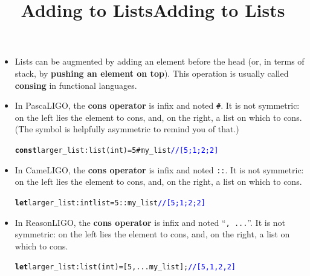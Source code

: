 \documentclass[wide]{slides}
\newcommand{\Kconst}[0]{\textbf{const}\xspace}
\newcommand{\Klet}[0]{\textbf{let}\xspace}
\newcommand{\com}[1]{\textcolor{blue}{{#1}}}
\begin{document}
\begin{slide}
  \title{Adding to Lists}

  \begin{itemize}

    \item Lists can be augmented by adding an element before the head
      (or, in terms of stack, by \textbf{pushing an element on
      top}). This operation is usually called \textbf{consing} in
      functional languages.

    \item In PascaLIGO, the \textbf{cons operator} is infix and noted
      \texttt{\#}. It is not symmetric: on the left lies the element to
      cons, and, on the right, a list on which to cons. (The symbol is
      helpfully asymmetric to remind you of that.)
      \begin{alltt}
\Kconst larger_list : list (int) = 5 \# my_list \com{// [5;1;2;2]}
      \end{alltt}

  \end{itemize}

\end{slide}

\begin{slide}
  \title{Adding to Lists}

  \begin{itemize}

    \item In CameLIGO, the \textbf{cons operator} is infix and noted
      \texttt{::}. It is not symmetric: on the left lies the element
      to cons, and, on the right, a list on which to cons.
      \begin{alltt}
\Klet larger_list : int list = 5 :: my_list \com{// [5;1;2;2]}
      \end{alltt}

    \item In ReasonLIGO, the \textbf{cons operator} is infix and noted
      ``\texttt{, ...}''. It is not symmetric: on the left lies the
      element to cons, and, on the right, a list on which to cons.
      \begin{alltt}
\Klet larger_list : list (int) = [5, ...my_list]; \com{// [5,1,2,2]}
      \end{alltt}

  \end{itemize}

\end{slide}
\end{document}
